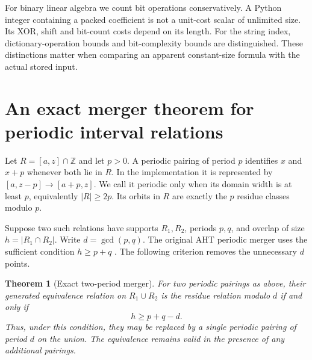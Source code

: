\documentclass[11pt]{article}
\newtheorem{theorem}{Theorem}[section]
\theoremstyle{definition}
\begin{document}
For binary linear algebra we count bit operations conservatively. A Python
integer containing a packed coefficient is not a unit-cost scalar of
unlimited size. Its XOR, shift and bit-count costs depend on its length.
For the string index, dictionary-operation bounds and bit-complexity bounds
are distinguished. These distinctions matter when comparing an apparent
constant-size formula with the actual stored input.

\section{An exact merger theorem for periodic interval relations}
\label{sec:merger}

Let $R=[a,z]\cap\mathbb Z$ and let $p>0$. A periodic pairing of period $p$
identifies $x$ and $x+p$ whenever both lie in $R$. In the implementation it
is represented by $[a,z-p]\to[a+p,z]$. We call it periodic only when its
domain width is at least $p$, equivalently $|R|\ge2p$. Its orbits in $R$
are exactly the $p$ residue classes modulo $p$.

Suppose two such relations have supports $R_1,R_2$, periods $p,q$, and
overlap of size $h=|R_1\cap R_2|$. Write $d=\gcd(p,q)$. The original AHT
periodic merger uses the sufficient condition $h\ge p+q$
\cite{aht}. The following criterion removes the unnecessary $d$ points.

\begin{theorem}[Exact two-period merger]
\label{thm:sharpmerge}
For two periodic pairings as above, their generated equivalence relation
on $R_1\cup R_2$ is the residue relation modulo $d$ if and only if
\[
                         h\ge p+q-d.
\]
Thus, under this condition, they may be replaced by a single periodic
pairing of period $d$ on the union. The equivalence remains valid in the
presence of any additional pairings.
\end{theorem}
\end{document}
